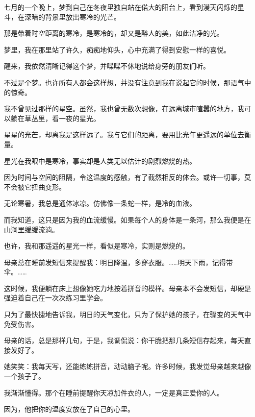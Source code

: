 		\vspace{1em}
		七月的一个晚上，梦到自己在冬夜里独自站在偌大的阳台上，看到漫天闪烁的星斗，在深暗的背景里放出寒冷的光芒。\par
		那是带着时空距离的寒冷，是寒冷的，却又是醉人的美，如此洁净的光。\par
		梦里，我在那里站了许久，痴痴地仰头，心中充满了得到安慰一样的喜悦。\par
		醒来，我依然清晰记得这个梦，并喋喋不休地说给身旁的朋友们听。\par
		不过是个梦。也许所有人都会这样想，并没有注意到我在说起它的时候，那语气中的惊奇。\par
		我不曾见过那样的星空。虽然，我也曾无数次想像，在远离城市喧嚣的地方，我可以躺在草丛里，看一夜的星光。\par
		星星的光芒，却离我是这样远了。我与它们的距离，要用比光年更遥远的单位去衡量。\par
		星光在我眼中是寒冷，事实却是人类无以估计的剧烈燃烧的热。\par
		因为时间与空间的阻隔，令这温度的感触，有了截然相反的体会。或许一切事，莫不会被它扭曲变形。

		\vspace{1em}
		无论寒暑，我总是通体冰凉。仿佛像一条蛇一样，是冷的血液。\par
		而我知道，这只是因为我的血流缓慢。如果每个人的身体是一条河，那么我便是在山涧里缓缓流淌。\par
		也许，我和那遥遥的星光一样，看似是寒冷，实则是燃烧的。

		\vspace{1em}
		母亲总在睡前发短信来提醒我：明日降温，多穿衣服。……明天下雨，记得带伞。……\par
		这时候，我便躺在床上想像她吃力地按着拼音的模样。母亲本不会发短信，却硬是强迫着自己在一次次练习里学会。\par
		只为了最快捷地告诉我，明日的天气变化，只为了保护她的孩子，在骤变的天气中免受伤害。\par
		母亲的话，总是那样几句，于是，我调侃说：你干脆把那几条短信存起来，每天直接发好了。\par
		她笑笑：我每天写，还能练练拼音，动动脑子呢。许多时候，我发觉母亲越来越像一个孩子了。

		\vspace{1em}
		我渐渐懂得。那个在睡前提醒你天凉加件衣的人，一定是真正爱你的人。\par
		因为，他把你的温度安放在了自己的心里。

	\endwriting


	\longpoem{}{}{}

